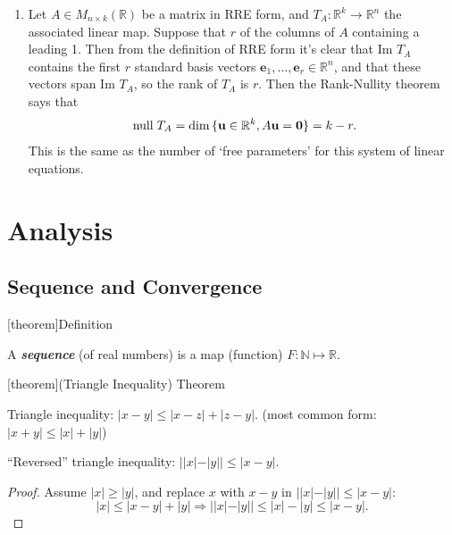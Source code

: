 \documentclass[12pt]{report}
\theoremstyle{definition}
\begin{document}
\begin{ex}
\begin{enumerate}[label = (\alph*)]
        \item Let $A \in M_{n\times k}(\mathbb{R})$ be a matrix in RRE form, and
            $T_A:\mathbb{R}^{k} \rightarrow{} \mathbb{R}^{n}$ the associated linear map.
            Suppose that $r$ of the columns of $A$ containing a leading 1.
            Then from the definition of RRE form it's clear that Im $T_A$ contains
            the first $r$ standard basis vectors $\mathbf{e}_1, \ldots, \mathbf{e}_r \in \mathbb{R}^{n}$,
            and that these vectors span Im $T_A$, so the rank of $T_A$ is $r$.
            Then the Rank-Nullity theorem says that\[
                \;\textnormal{null}\;T_A = \dim{\{\mathbf{u}\in \mathbb{R}^{k}, A\mathbf{u} = \mathbf{0}\}} = k - r.
            \]This is the same as the number of `free parameters' for this system of linear equations.
    \end{enumerate}
    
\end{ex}









\chapter{Analysis}

\section{Sequence and Convergence}

[theorem]{Definition}
\begin{sequence}
    A \textbf{\emph{sequence}} (of real numbers) is a map (function) $F: \mathbb{N} \mapsto \mathbb{R}$.
\end{sequence}

[theorem]{(Triangle Inequality) Theorem}
\begin{triangle inequality}
    Triangle inequality: $|x-y| \le |x-z| + |z-y|$. (most common form: $|x+y| \le |x| + |y|$)

    ``Reversed'' triangle inequality: $||x|-|y|| \le |x-y|$.
\end{triangle inequality}

\begin{proof}
    Assume $|x| \ge |y|$, and replace $x$ with $x - y$ in $||x|-|y|| \le |x-y|$:\[
        |x| \le |x-y|+|y| \Rightarrow{}||x|-|y|| \le |x|-|y| \le |x-y|.
    \]
\end{proof}
\end{document}
